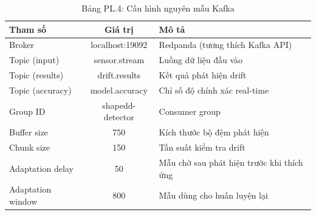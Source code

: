\begin{table}[H]
	\centering
	\caption*{Bảng PL.4: Cấu hình nguyên mẫu Kafka}
	\begin{tabular}{|l|c|p{7cm}|}
		\hline
		\textbf{Tham số} & \textbf{Giá trị} & \textbf{Mô tả} \\
		\hline
		Broker & localhost:19092 & Redpanda (tương thích Kafka API) \\
		Topic (input) & sensor.stream & Luồng dữ liệu đầu vào \\
		Topic (results) & drift.results & Kết quả phát hiện drift \\
		Topic (accuracy) & model.accuracy & Chỉ số độ chính xác real-time \\
		Group ID & shapedd-detector & Consumer group \\
		Buffer size & 750 & Kích thước bộ đệm phát hiện \\
		Chunk size & 150 & Tần suất kiểm tra drift \\
		Adaptation delay & 50 & Mẫu chờ sau phát hiện trước khi thích ứng \\
		Adaptation window & 800 & Mẫu dùng cho huấn luyện lại \\
		\hline
	\end{tabular}
\end{table}

